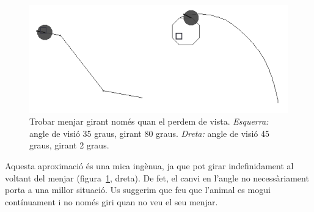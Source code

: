 \begin{figure}[h!]
\begin{center}
\includegraphics[scale=2]{Imatges/figura23-18}
\end{center}
\caption{Trobar menjar girant només quan el perdem de vista. \emph{Esquerra:} angle de visió 35 graus, girant 80 graus. \emph{Dreta:} angle de visió 45 graus, girant 2 graus.}
\label{fig2318}
\end{figure}

Aquesta aproximació és una mica ingènua, ja que pot girar indefinidament al voltant del menjar (figura~\ref{fig2318}, dreta). De fet, el canvi en l'angle no necessàriament porta a una millor situació. Us suggerim que feu que l'animal es mogui contínuament i no només giri quan no veu el seu menjar.


